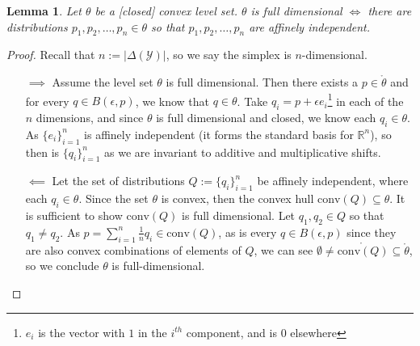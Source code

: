 \documentclass[12pt]{article}
\newcommand{\reals}{\mathbb{R}}
\newcommand{\Y}{\mathcal{Y}}
\newcommand{\inter}[1]{\mathring{#1}}%
\newcommand{\conv}{\mathrm{conv}}
\newtheorem{lemma}{Lemma}
\begin{document}
\begin{lemma}
	Let $\theta$ be a [closed] convex level set.
	$\theta$ is full dimensional $\iff$ there are distributions $p_1, p_2, \ldots, p_n \in \theta$ so that $p_1, p_2, \ldots, p_n$ are affinely independent.
\end{lemma}
\begin{proof}
	Recall that $n := |\Delta(\Y)|$, so we say the simplex is $n$-dimensional.
	\begin{enumerate}
		\item [$\implies$]
		Assume the level set $\theta$ is full dimensional.
		Then there exists a $p \in \inter{\theta}$ and for every $q \in B(\epsilon, p)$, we know that $q \in \theta$.
		Take $q_i = p + \epsilon e_i$\footnote{$e_i$ is the vector with $1$ in the $i^{th}$ component, and is $0$ elsewhere} in each of the $n$ dimensions, and since $\theta$ is full dimensional and closed, we know each $q_i \in\theta$.
		As $\{e_i\}_{i=1}^n$ is affinely independent (it forms the standard basis for $\reals^n$), so then is $\{q_i\}_{i=1}^n$ as we are invariant to additive and multiplicative shifts.		
		
		\item [$\impliedby$]
		Let the set of distributions $Q := \{q_i\}_{i=1}^n$ be affinely independent, where each $q_i \in \theta$.
		Since the set $\theta$ is convex, then the convex hull $\conv(Q) \subseteq \theta$.
		It is sufficient to show $\conv(Q)$ is full dimensional.
		Let $q_1, q_2 \in Q$ so that $q_1 \neq q_2$.
		As $p = \sum_{i=1}^n \frac{1}{n}q_i \in \conv(Q)$, as is every $q \in B(\epsilon, p)$ since they are also convex combinations of elements of $Q$, we can see $\emptyset \neq \inter{\conv(Q)} \subseteq \inter{\theta}$, so we conclude $\theta$ is full-dimensional.
	\end{enumerate}
\end{proof}
\end{document}
